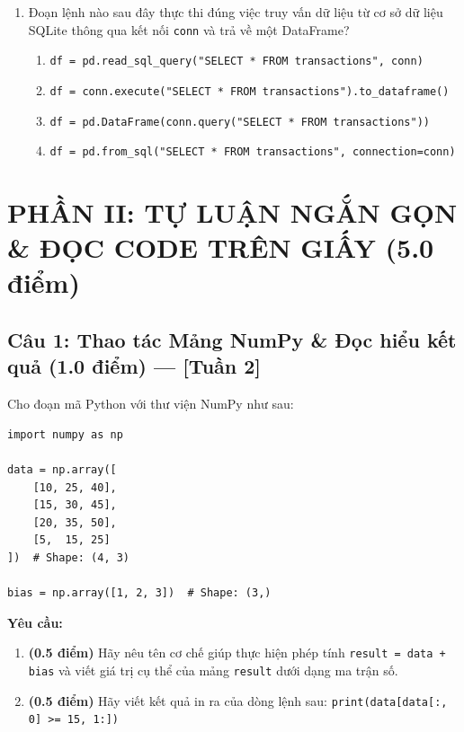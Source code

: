 \documentclass[11pt,a4paper]{article}
\begin{document}
\begin{enumerate}[leftmargin=*,itemsep=2.5pt,resume]
\item Đoạn lệnh nào sau đây thực thi đúng việc truy vấn dữ liệu từ cơ sở dữ liệu SQLite thông qua kết nối \texttt{conn} và trả về một DataFrame?
\begin{enumerate}[label=\Alph*.]
  \item \texttt{df = pd.read\_sql\_query("SELECT * FROM transactions", conn)}
  \item \texttt{df = conn.execute("SELECT * FROM transactions").to\_dataframe()}
  \item \texttt{df = pd.DataFrame(conn.query("SELECT * FROM transactions"))}
  \item \texttt{df = pd.from\_sql("SELECT * FROM transactions", connection=conn)}
\end{enumerate}

\end{enumerate}

\newpage
\section*{PHẦN II: TỰ LUẬN NGẮN GỌN \& ĐỌC CODE TRÊN GIẤY (5.0 điểm)}

\subsection*{Câu 1: Thao tác Mảng NumPy \& Đọc hiểu kết quả (1.0 điểm) --- [Tuần 2]}
Cho đoạn mã Python với thư viện NumPy như sau:
\begin{lstlisting}
import numpy as np

data = np.array([
    [10, 25, 40],
    [15, 30, 45],
    [20, 35, 50],
    [5,  15, 25]
])  # Shape: (4, 3)

bias = np.array([1, 2, 3])  # Shape: (3,)
\end{lstlisting}

\noindent
\textbf{Yêu cầu:}
\begin{enumerate}[label=\textbf{\alph*)}]
  \item \textbf{(0.5 điểm)} Hãy nêu tên cơ chế giúp thực hiện phép tính \texttt{result = data + bias} và viết giá trị cụ thể của mảng \texttt{result} dưới dạng ma trận số.
  \item \textbf{(0.5 điểm)} Hãy viết kết quả in ra của dòng lệnh sau: \quad \texttt{print(data[data[:, 0] >= 15, 1:])}
\end{enumerate}
\end{document}
